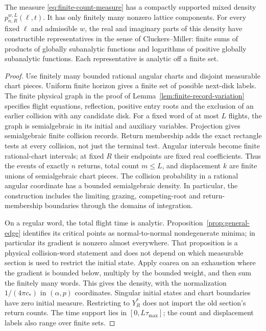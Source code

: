 \begin{lemma}
\label{lem:finite-graph-density}
The measure \eqref{eq:finite-count-measure} has a compactly supported
mixed density $p_{n,R}^{w,L}(\ell,t)$. It has only finitely many nonzero
lattice components. For every fixed $\ell$ and admissible $w$, the real
and imaginary parts of this density have constructible representatives
in the sense of Cluckers--Miller: finite sums of products of globally
subanalytic functions and logarithms of positive globally subanalytic
functions. Each representative is analytic off a finite set.
\end{lemma}
\begin{proof}
Use finitely many bounded rational angular charts and disjoint measurable
chart pieces. Uniform finite horizon gives a finite set of possible
next-disk labels. The finite physical graph in the proof of
Lemma~\ref{lem:finite-record-variation} specifies flight equations, reflection,
positive entry roots and the exclusion of an earlier collision with any
candidate disk. For a fixed word of at most $L$ flights, the graph is
semialgebraic in its initial and auxiliary variables. Projection gives
semialgebraic finite collision records. Return membership adds the exact
rectangle tests at every collision, not just the terminal test. Angular
intervals become finite rational-chart intervals; at fixed $R$ their
endpoints are fixed real coefficients. Thus the events of exactly $n$
returns, total count $m\le L$, and displacement $k$ are finite unions of
semialgebraic chart pieces. The collision probability in a rational
angular coordinate has a bounded semialgebraic density. In particular,
the construction includes the limiting grazing, competing-root and
return-membership boundaries through the domains of integration.

On a regular word, the total flight time is analytic.
Proposition~\ref{prop:general-edge} identifies its critical points as
normal-to-normal nondegenerate minima; in particular its gradient is
nonzero almost everywhere. That proposition is a physical collision-word
statement and does not depend on which measurable section is used to
restrict the initial state. Apply coarea on an exhaustion where the
gradient is bounded below, multiply by the bounded weight, and then sum
the finitely many words. This gives the density, with the normalization
$1/(4\pi c_*)$ in $(\alpha,p)$ coordinates. Singular initial states and
chart boundaries have zero initial measure. Restricting to $Y_R^*$
does not import the old section's return counts. The time support lies
in $[0,L\tau_{\max}]$; the count and displacement labels also range over
finite sets.


\end{proof}
